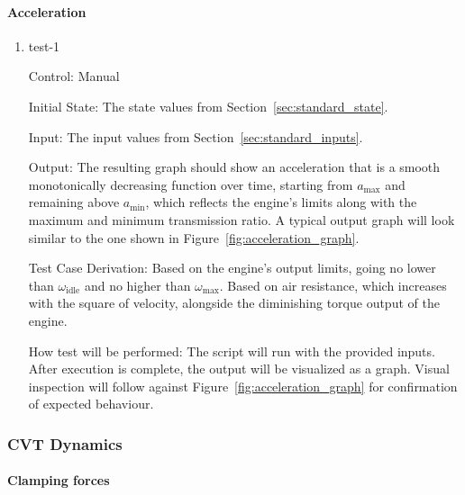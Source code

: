 \documentclass[12pt, titlepage]{article}
\begin{document}
\paragraph{Acceleration}

\begin{enumerate}

  \item{test-1\\}
  
  Control: Manual
            
  Initial State: The state values from Section~\ref{sec:standard_state}.
  
  Input: The input values from Section~\ref{sec:standard_inputs}.
            
  Output: The resulting graph should show an acceleration that is a smooth monotonically decreasing function over time, starting from $a_\text{max}$ and remaining above $a_\text{min}$, which reflects the engine's limits along with the maximum and minimum transmission ratio. A typical output graph will look similar to the one shown in Figure~\ref{fig:acceleration_graph}.
  
  Test Case Derivation: Based on the engine's output limits, going no lower than $\omega_\text{idle}$ and no higher than $\omega_\text{max}$.
  Based on air resistance, which increases with the square of velocity, alongside the diminishing torque output of the engine.
  
  How test will be performed: The script will run with the provided inputs. After execution is complete, the output will be visualized as a graph. Visual inspection will follow against Figure~\ref{fig:acceleration_graph} for confirmation of expected behaviour.
  
\end{enumerate}

\subsubsection{CVT Dynamics}

\paragraph{Clamping forces}
\end{document}
